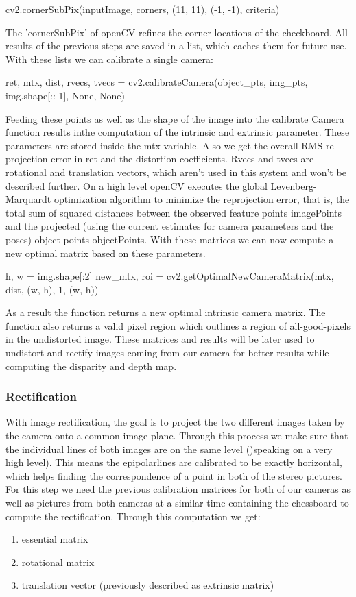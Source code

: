 \documentclass[journal,onecolumn]{IEEEtran}
\begin{document}
\begin{python}
cv2.cornerSubPix(inputImage,
		corners,
		(11, 11),
		(-1, -1),
		criteria)
\end{python}
The 'cornerSubPix' of openCV refines the corner locations \cite{forstner} of the checkboard.
All results of the previous steps are saved in a list, which caches them for future use. With these lists we can calibrate a single camera:
\begin{python}
ret, mtx, dist, rvecs, tvecs = cv2.calibrateCamera(object_pts,
						   img_pts,
						   img.shape[::-1], None, None)
\end{python}
Feeding these points as well as the shape of the image into the calibrate Camera function results inthe computation of the intrinsic and extrinsic parameter.
These parameters are stored inside the mtx variable. Also we get the overall RMS re-projection error in ret and the distortion coefficients. Rvecs\cite{DBLP} and tvecs are rotational and translation vectors, which aren't used in this system and won't be described further.
On a high level openCV executes the global Levenberg-Marquardt optimization algorithm to minimize the reprojection error, that is, the total sum of squared distances between the observed feature points imagePoints and the projected (using the current estimates for camera parameters and the poses) object points objectPoints\cite{calibrateCamera}.
With these matrices we can now compute a new optimal matrix based on these parameters.
\begin{python}
h, w = img.shape[:2]
new_mtx, roi = cv2.getOptimalNewCameraMatrix(mtx,
				   	     dist,
				   	     (w, h), 1, (w, h))
\end{python}
As a result the function returns a new optimal intrinsic camera matrix. The function also returns a valid pixel region which outlines a region of all-good-pixels in the undistorted image. These matrices and results will be later used to undistort and rectify images coming from our camera for better results while computing the disparity and depth map.
\subsubsection{Rectification}
\noindent
With image rectification, the goal is to project the two different images taken by the camera onto a common image plane. Through this process we make sure that the individual lines of both images are on the same level ()speaking on a very high level). This means the epipolarlines are calibrated to be exactly horizontal, which helps finding the correspondence of a point in both of the stereo pictures.
For this step we need the previous calibration matrices for both of our cameras as well as pictures from both cameras at a similar time containing the chessboard to compute the rectification. Through this computation we get:
\begin{enumerate}
	\item essential matrix
	\item rotational matrix
	\item translation vector (previously described as extrinsic matrix)
\end{enumerate}
\end{document}
